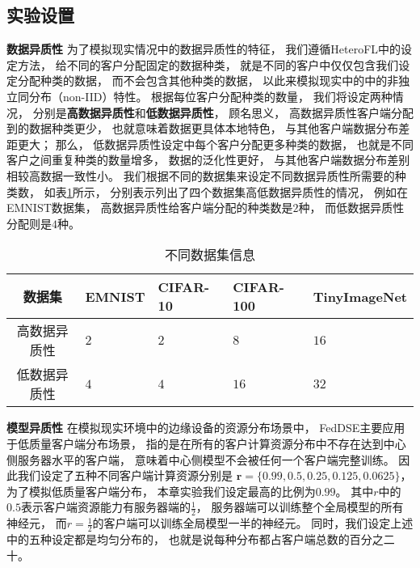 \subsection{实验设置}
\textbf{数据异质性 } 
为了模拟现实情况中的数据异质性的特征，
我们遵循HeteroFL中的设定方法\cite{li2020federated, diao2020heterofl}，
给不同的客户分配固定的数据种类，
就是不同的客户中仅仅包含我们设定分配种类的数据，
而不会包含其他种类的数据，
以此来模拟现实中的中的非独立同分布（non-IID）特性。
根据每位客户分配种类的数量，
我们将设定两种情况，
分别是\textbf{高数据异质性}和\textbf{低数据异质性}，
顾名思义，
高数据异质性客户端分配到的数据种类更少，
也就意味着数据更具体本地特色，
与其他客户端数据分布差距更大；
那么，
低数据异质性设定中每个客户分配更多种类的数据，
也就是不同客户之间重复种类的数量增多，
数据的泛化性更好，
与其他客户端数据分布差别相较高数据一致性小。
我们根据不同的数据集来设定不同数据异质性所需要的种类数，
如表\ref{tab:classinfo}所示，
分别表示列出了四个数据集高低数据异质性的情况，
例如在EMNIST数据集，
高数据异质性给客户端分配的种类数是$2$种，
而低数据异质性分配则是$4$种。
\begin{table}[thbp]
    \caption{\label{tab:classinfo}不同数据集信息}
    \begin{tabularx}{\linewidth}{c X<{\centering} X<{\centering} X<{\centering} X<{\centering}}
        \toprule
        数据集 & EMNIST & CIFAR-10 & CIFAR-100 & TinyImageNet \\ \hline
        高数据异质性 & $2$ & $2$ & $8$ & $16$ \\ 
        低数据异质性 & $4$ & $4$ & $16$ & $32$ \\ 
        \bottomrule
    \end{tabularx}
\end{table}

\textbf{模型异质性 }
在模拟现实环境中的边缘设备的资源分布场景中，
FedDSE主要应用于低质量客户端分布场景，
指的是在所有的客户计算资源分布中不存在达到中心侧服务器水平的客户端，
意味着中心侧模型不会被任何一个客户端完整训练。
因此我们设定了五种不同客户端计算资源分别是
$\mathbf{r} = \{ 0.99, 0.5, 0.25, 0.125, 0.0625 \}$，
为了模拟低质量客户端分布\cite{li2020federated, diao2020heterofl}，
本章实验我们设定最高的比例为$0.99$。
其中$r$中的$0.5$表示客户端资源能力有服务器端的$\frac{1}{2}$，
服务器端可以训练整个全局模型的所有神经元，
而$r=\frac{1}{2}$的客户端可以训练全局模型一半的神经元。
同时，我们设定上述中的五种设定都是均匀分布的，
也就是说每种分布都占客户端总数的百分之二十。

